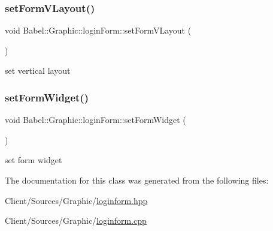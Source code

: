 \subsubsection{\texorpdfstring{set\+Form\+V\+Layout()}{setFormVLayout()}}
{\footnotesize\ttfamily void Babel\+::\+Graphic\+::login\+Form\+::set\+Form\+V\+Layout (\begin{DoxyParamCaption}{ }\end{DoxyParamCaption})}

set vertical layout \mbox{\label{classBabel_1_1Graphic_1_1loginForm_aa2292182ad4bc5760fd4d7f207a829c1}} 
\subsubsection{\texorpdfstring{set\+Form\+Widget()}{setFormWidget()}}
{\footnotesize\ttfamily void Babel\+::\+Graphic\+::login\+Form\+::set\+Form\+Widget (\begin{DoxyParamCaption}{ }\end{DoxyParamCaption})}

set form widget 

The documentation for this class was generated from the following files\+:\begin{DoxyCompactItemize}
\item 
Client/\+Sources/\+Graphic/\hyperlink{loginform_8hpp}{loginform.\+hpp}\item 
Client/\+Sources/\+Graphic/\hyperlink{loginform_8cpp}{loginform.\+cpp}\end{DoxyCompactItemize}
